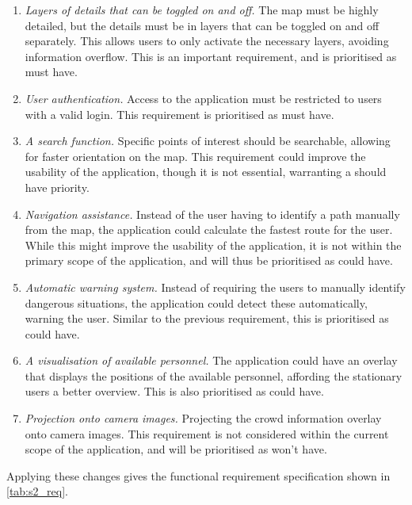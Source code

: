 \begin{enumerate}[resume]
    \item \emph{Layers of details that can be toggled on and off.} The map must be highly detailed, but the details must be in layers that can be toggled on and off separately. This allows users to only activate the necessary layers, avoiding information overflow. This is an important requirement, and is prioritised as must have.
    \item \emph{User authentication.} Access to the application must be restricted to users with a valid login. This requirement is prioritised as must have.
    \item \emph{A search function.} Specific points of interest should be searchable, allowing for faster orientation on the map. This requirement could improve the usability of the application, though it is not essential, warranting a should have priority.
    \item \emph{Navigation assistance.} Instead of the user having to identify a path manually from the map, the application could calculate the fastest route for the user. While this might improve the usability of the application, it is not within the primary scope of the application, and will thus be prioritised as could have.
    \item \emph{Automatic warning system.} Instead of requiring the users to manually identify dangerous situations, the application could detect these automatically, warning the user. Similar to the previous requirement, this is prioritised as could have.
    \item \emph{A visualisation of available personnel.} The application could have an overlay that displays the positions of the available personnel, affording the stationary users a better overview. This is also prioritised as could have.
    \item \emph{Projection onto camera images.} Projecting the crowd information overlay onto camera images. This requirement is not considered within the current scope of the application, and will be prioritised as won't have.
\end{enumerate}

Applying these changes gives the functional requirement specification shown in \cref{tab:s2_req}.

